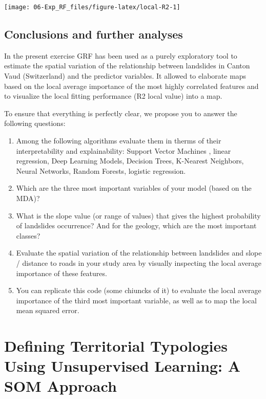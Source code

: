 \documentclass[
]{article}
\begin{document}
\begin{center}\texttt{[image: 06-Exp\_RF\_files/figure-latex/local-R2-1]} \end{center}

\subsection{Conclusions and further analyses}\label{conclusions-and-further-analyses-3}

In the present exercise GRF has been used as a purely exploratory tool to estimate the spatial variation of the relationship between landslides in Canton Vaud (Switzerland) and the predictor variables.
It allowed to elaborate maps based on the local average importance of the most highly correlated features and to visualize the local fitting performance (R2 local value) into a map.

To ensure that everything is perfectly clear, we propose you to answer the following questions:

\begin{enumerate}
\def\labelenumi{\arabic{enumi}.}
\item
  Among the following algorithms evaluate them in therms of their interpretability and explainability: Support Vector Machines , linear regression, Deep Learning Models, Decision Trees, K-Nearest Neighbors, Neural Networks, Random Forests, logistic regression.
\item
  Which are the three most important variables of your model (based on the MDA)?
\item
  What is the slope value (or range of values) that gives the highest probability of landslides occurrence?
  And for the geology, which are the most important classes?
\item
  Evaluate the spatial variation of the relationship between landslides and slope / distance to roads in your study area by visually inspecting the local average importance of these features.
\item
  You can replicate this code (some chiuncks of it) to evaluate the local average importance of the third most important variable, as well as to map the local mean squared error.
\end{enumerate}

\section{Defining Territorial Typologies Using Unsupervised Learning: A SOM Approach}\label{som}
\end{document}
